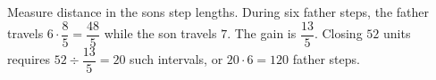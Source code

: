 Measure distance in the son\textquotesingle s step lengths. During six father steps, the father travels $6\cdot\dfrac{8}{5}=\dfrac{48}{5}$ while the son travels $7$. The gain is $\dfrac{13}{5}$. Closing $52$ units requires $52\div\dfrac{13}{5}=20$ such intervals, or $20\cdot6=\boxed{120}$ father steps.
